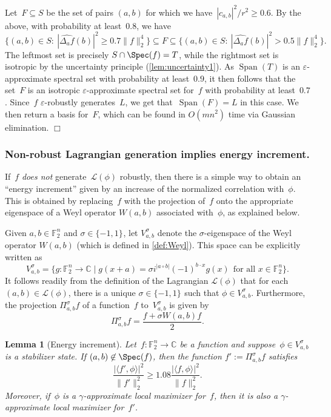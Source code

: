 \documentclass[11pt]{amsart}
\newcommand{\C}{\mathbb{C}} %
\newcommand{\F}{\mathbb{F}} %
\newcommand{\Lcal}{\mathcal{L}}
\newcommand{\pmset}[1]{\{-1,1\}^{#1}} %
\DeclareMathOperator{\vspan}{Span} %
\newcommand{\eps}{\varepsilon}
\theoremstyle{plain}
\newtheorem{lemma}[theorem]{Lemma}
\theoremstyle{definition}
\theoremstyle{remark}
\renewenvironment{proof}[1][]{
    	\begin{trivlist}
     	\item[\hspace{\labelsep}{\em\noindent Proof#1:\/}]}
     	{{\hfill$\Box$}
    	\end{trivlist}
  }
\begin{document}
\begin{proof}
Let~$F\subseteq S$ be the set of pairs $(a,b)$ for which we have~$|c_{a,b}|^2/r^2 \geq 0.6$.
By the above, with probability at least~$0.8$, we have
$$\big\{(a,b)\in S:\: |\widehat{\Delta_af}(b)|^2 \geq 0.7 \|f\|_2^4\big\} \subseteq F \subseteq \big\{(a,b)\in S:\: |\widehat{\Delta_af}(b)|^2 > 0.5 \|f\|_2^4\big\}.$$
The leftmost set is precisely $S\cap\Spec(f) = T$, while the rightmost set is isotropic by the uncertainty principle (\cref{lem:uncertainty1}).
As $\vspan(T)$ is an $\eps$-approximate spectral set with probability at least~$0.9$, it then follows that the set~$F$ is an isotropic $\eps$-approximate spectral set for~$f$ with probability at least~$0.7$.
Since~$f$ $\eps$-robustly generates~$L$, we get that~$\vspan(F) = L$ in this case.
We then return a basis for~$F$, which can be found in $O(mn^2)$ time via Gaussian elimination.
\end{proof}


\subsubsection{Non-robust Lagrangian generation implies energy increment.}

If~$f$ \emph{does not} generate~$\mathcal L(\phi)$ robustly, then there is a simple way to obtain an ``energy increment'' given by an increase of the normalized correlation with~$\phi$.
This is obtained by replacing~$f$ with the projection of~$f$ onto the appropriate eigenspace of a Weyl operator $W(a,b)$ associated with~$\phi$, as explained below.

Given $a, b\in \F_2^n$ and $\sigma\in \pmset{}$, let $V_{a,b}^{\sigma}$ denote the $\sigma$-eigenspace of the Weyl operator $W(a,b)$
(which is defined in \cref{def:Weyl}).
This space can be  explicitly written as
\begin{equation*}
    V_{a,b}^{\sigma} = \big\{g: \F_2^n\to \C\mid g(x+a) = \sigma i^{|a\circ b|} (-1)^{b\cdot x} g(x)\:\:\text{for all $x\in \F_2^n$}\big\}.
\end{equation*}
It follows readily from the definition of the Lagrangian $\Lcal(\phi)$ that for each $(a,b)\in \mathcal L(\phi)$, there is  a unique $\sigma\in \pmset{}$ such that $\phi\in V_{a,b}^\sigma$.
Furthermore, the projection $\Pi_{a,b}^{\sigma}f$ of a function~$f$ to~$V_{a,b}^{\sigma}$ is given by 
\begin{equation*}
    \Pi_{a,b}^{\sigma}f = \frac{f + \sigma W(a,b)f}{2}.
\end{equation*}

\begin{lemma}[Energy increment] \label{lem:boost}
    Let~$f:\F_2^n\to \C$ be a function and suppose~$\phi\in V_{a,b}^{\sigma}$ is a stabilizer state.
    If $(a,b)\not\in \Spec(f)$, then the function $f' := \Pi_{a,b}^{\sigma}f$ satisfies
    \begin{equation*}
        \frac{|\langle f',\phi\rangle|^2 }{\|f'\|_{2}^2} \geq 1.08\frac{|\langle f, \phi\rangle|^2}{\|f\|_{2}^2}.
    \end{equation*}
    Moreover, if~$\phi$ is a $\gamma$-approximate local maximizer for~$f$, then it is also a $\gamma$-approximate local maximizer for~$f'$.
\end{lemma}
\end{document}
